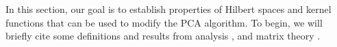 In this section, our goal is to establish properties of Hilbert spaces and kernel functions that can be used to modify the PCA algorithm.
To begin, we will briefly cite some definitions and results from analysis \cite{kreyszig1991introductory}, \cite{rudin1987real} and matrix theory \cite{horn2013matrix}.